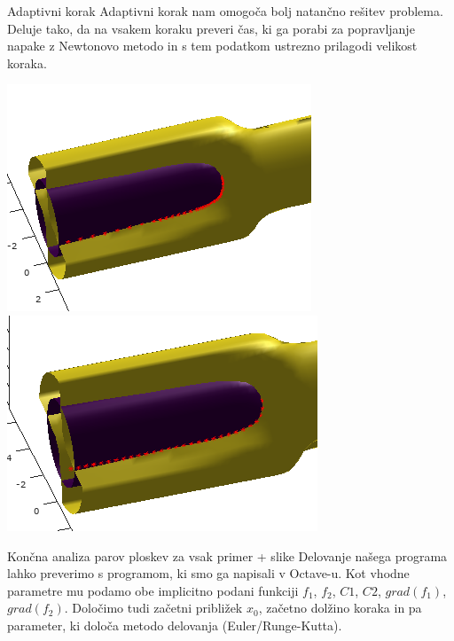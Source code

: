 \documentclass{beamer}
\begin{document}
	\begin{frame}{Adaptivni korak}
	    Adaptivni korak nam omogoča bolj natančno rešitev problema. Deluje tako, da na vsakem koraku preveri čas, ki ga porabi za popravljanje napake z Newtonovo metodo in s tem podatkom ustrezno prilagodi velikost koraka.
	    
	    \includegraphics[scale=0.6]{slikaAda}
		\includegraphics[scale=0.6]{slikaAda2}
		
	\end{frame}
	
	\begin{frame}{Končna analiza parov ploskev za vsak primer + slike}
		Delovanje našega programa lahko preverimo s programom, ki smo ga napisali v Octave-u. Kot vhodne parametre mu podamo obe implicitno podani funkciji $f_{1}$, $f_{2}$, $C1$, $C2$, $grad(f_{1})$, $grad(f_{2})$. Določimo tudi začetni približek $x_{0}$, začetno dolžino koraka in pa parameter, ki določa metodo delovanja (Euler/Runge-Kutta).
	\end{frame}
	
\end{document}
